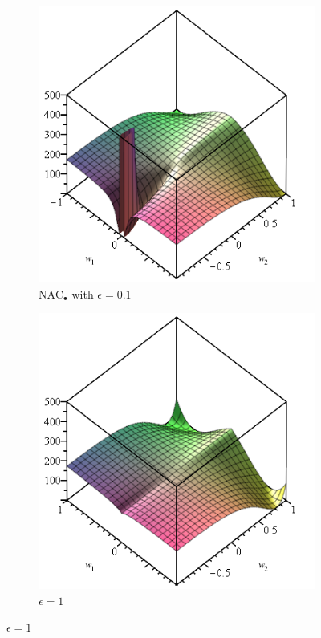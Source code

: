 \begin{figure}[h]
\begin{subfigure}{.33\textwidth}
  \includegraphics[width=\linewidth,trim={0 0 0 4.35cm},clip]{graphics/nac-mul-eps-1em1.png}
  \caption{$\mathrm{NAC}_{\bullet}$ with $\epsilon = 0.1$}
\end{subfigure}
\begin{subfigure}{.33\textwidth}
  \centering
  \includegraphics[width=\linewidth,trim={0 0 0 4.35cm},clip]{graphics/nac-mul-eps-1.png}
  \caption{$\epsilon = 1$}
\end{subfigure}


\end{figure}
